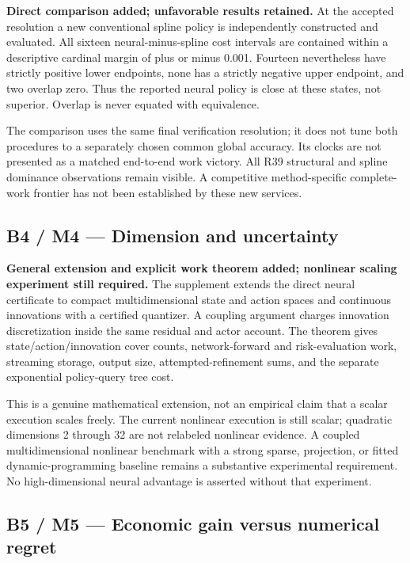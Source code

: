 \documentclass[
  11pt,
]{article}
\begin{document}
\textbf{Direct comparison added; unfavorable results retained.} At the
accepted resolution a new conventional spline policy is independently
constructed and evaluated. All sixteen neural-minus-spline cost
intervals are contained within a descriptive cardinal margin of plus or
minus 0.001. Fourteen nevertheless have strictly positive lower
endpoints, none has a strictly negative upper endpoint, and two overlap
zero. Thus the reported neural policy is close at these states, not
superior. Overlap is never equated with equivalence.

The comparison uses the same final verification resolution; it does not
tune both procedures to a separately chosen common global accuracy. Its
clocks are not presented as a matched end-to-end work victory. All R39
structural and spline dominance observations remain visible. A
competitive method-specific complete-work frontier has not been
established by these new services.

\hypertarget{b4-m4-dimension-and-uncertainty}{%
\subsection{B4 / M4 --- Dimension and
uncertainty}\label{b4-m4-dimension-and-uncertainty}}

\textbf{General extension and explicit work theorem added; nonlinear
scaling experiment still required.} The supplement extends the direct
neural certificate to compact multidimensional state and action spaces
and continuous innovations with a certified quantizer. A coupling
argument charges innovation discretization inside the same residual and
actor account. The theorem gives state/action/innovation cover counts,
network-forward and risk-evaluation work, streaming storage, output
size, attempted-refinement sums, and the separate exponential
policy-query tree cost.

This is a genuine mathematical extension, not an empirical claim that a
scalar execution scales freely. The current nonlinear execution is still
scalar; quadratic dimensions 2 through 32 are not relabeled nonlinear
evidence. A coupled multidimensional nonlinear benchmark with a strong
sparse, projection, or fitted dynamic-programming baseline remains a
substantive experimental requirement. No high-dimensional neural
advantage is asserted without that experiment.

\hypertarget{b5-m5-economic-gain-versus-numerical-regret}{%
\subsection{B5 / M5 --- Economic gain versus numerical
regret}\label{b5-m5-economic-gain-versus-numerical-regret}}
\end{document}
